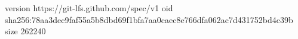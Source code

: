 version https://git-lfs.github.com/spec/v1
oid sha256:78aa3dec9faf55a5b8dbd69f1bfa7aa0caec8e766dfa062ac7d431752bd4c39b
size 262240
